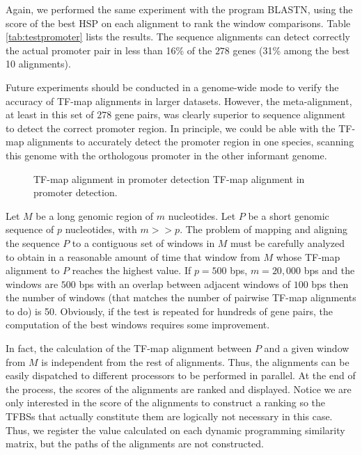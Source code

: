 Again, we performed the same experiment with the program BLASTN, using the score of the 
best HSP on each alignment to rank the window comparisons. Table \ref{tab:testpromoter} 
lists the results. The sequence alignments can detect correctly the actual promoter 
pair in less than 16\% of the $278$ genes (31\% among the best 10 alignments).

Future experiments should be conducted in a genome-wide mode to verify the accuracy
of TF-map alignments in larger datasets. However, the meta-alignment, at least in this 
set of $278$ gene pairs, was clearly superior to sequence alignment to detect the correct
promoter region. In principle, we could be able with the TF-map alignments 
to accurately detect the promoter region in one species, scanning this genome with the 
orthologous promoter in the other informant genome.

\begin{figure}[t!]
\begin{center}
\setlength{\fboxsep}{0pt}
          {TF-map alignment in promoter detection}%
          {TF-map alignment in promoter detection.}%
          {}
\end{center}
\end{figure}

 
Let $M$ be a long genomic region of $m$ nucleotides. Let $P$ be a short genomic 
sequence of $p$ nucleotides, with $m >> p$. The problem of mapping and aligning 
the sequence $P$ to a contiguous set of windows in $M$ must be carefully analyzed
to obtain in a reasonable  amount of time that window from $M$ whose TF-map alignment 
to $P$ reaches the highest value. If $p=500$ bps, $m=20,000$ bps and the windows are 
$500$ bps with an overlap between adjacent windows of $100$ bps then the number of 
windows (that matches the number of pairwise TF-map alignments to do) is 50. Obviously, 
if the test is repeated for hundreds of gene pairs, the computation of the best windows 
requires some improvement.

In fact, the calculation of the TF-map alignment between $P$ and a given window from
$M$ is independent from the rest of alignments. Thus, the alignments can be easily
dispatched to different processors to be performed in parallel. At the end of the
process, the scores of the alignments are ranked and displayed. Notice we are only 
interested in the score of the alignments to construct a ranking so the TFBSs that 
actually constitute them are logically not necessary in this case. Thus, we
register the value calculated on each dynamic programming similarity matrix,
but the paths of the alignments are not constructed.


